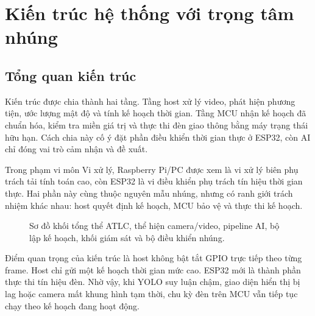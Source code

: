 \section{Kiến trúc hệ thống với trọng tâm nhúng}

\subsection{Tổng quan kiến trúc}

Kiến trúc \projectname{} được chia thành hai tầng. Tầng host xử lý video, phát hiện phương tiện, ước lượng mật độ và tính kế hoạch thời gian. Tầng MCU nhận kế hoạch đã chuẩn hóa, kiểm tra miền giá trị và thực thi đèn giao thông bằng máy trạng thái hữu hạn. Cách chia này cố ý đặt phần điều khiển thời gian thực ở ESP32, còn AI chỉ đóng vai trò cảm nhận và đề xuất.

Trong phạm vi môn Vi xử lý, Raspberry Pi/PC được xem là vi xử lý biên phụ trách tải tính toán cao, còn ESP32 là vi điều khiển phụ trách tín hiệu thời gian thực. Hai phần này cùng thuộc nguyên mẫu nhúng, nhưng có ranh giới trách nhiệm khác nhau: host quyết định kế hoạch, MCU bảo vệ và thực thi kế hoạch.

\begin{figure}[H]
  \centering
  \caption{Sơ đồ khối tổng thể ATLC, thể hiện camera/video, pipeline AI, bộ lập kế hoạch, khối giám sát và bộ điều khiển nhúng.}
  \label{fig:atlc-block}
\end{figure}

Điểm quan trọng của kiến trúc là host không bật tắt GPIO trực tiếp theo từng frame. Host chỉ gửi một kế hoạch thời gian mức cao. ESP32 mới là thành phần thực thi tín hiệu đèn. Nhờ vậy, khi YOLO suy luận chậm, giao diện hiển thị bị lag hoặc camera mất khung hình tạm thời, chu kỳ đèn trên MCU vẫn tiếp tục chạy theo kế hoạch đang hoạt động.

